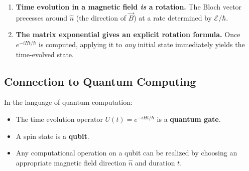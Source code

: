 \documentclass[11pt,a4paper]{article}
\theoremstyle{definition}
\theoremstyle{plain}
\theoremstyle{remark}
\begin{document}
\begin{enumerate}
    \item \textbf{Time evolution in a magnetic field \emph{is} a rotation.} The Bloch vector precesses around $\hat{n}$ (the direction of $\vec{B}$) at a rate determined by $\mathcal{E}/\hbar$.
    \item \textbf{The matrix exponential gives an explicit rotation formula.} Once $e^{-iHt/\hbar}$ is computed, applying it to \emph{any} initial state immediately yields the time-evolved state.
\end{enumerate}

\subsection{Connection to Quantum Computing}

In the language of quantum computation:
\begin{itemize}
    \item The time evolution operator $U(t) = e^{-iHt/\hbar}$ is a \textbf{quantum gate}.
    \item A spin state is a \textbf{qubit}.
    \item Any computational operation on a qubit can be realized by choosing an appropriate magnetic field direction $\hat{n}$ and duration $t$.
\end{itemize}
\end{document}
